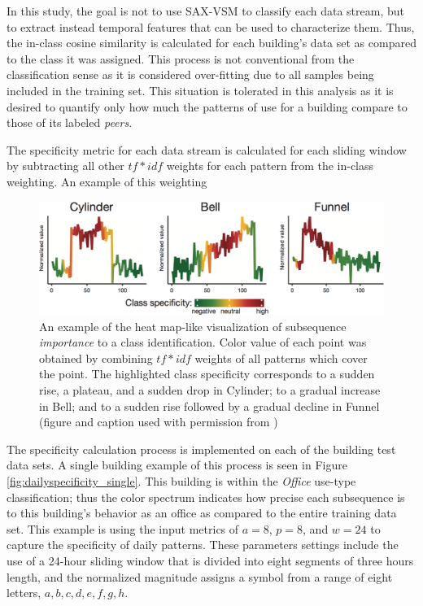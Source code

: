 In this study, the goal is not to use SAX-VSM to classify each data stream, but to extract instead temporal features that can be used to characterize them. Thus, the in-class cosine similarity is calculated for each building's data set as compared to the class it was assigned. This process is not conventional from the classification sense as it is considered over-fitting due to all samples being included in the training set. This situation is tolerated in this analysis as it is desired to quantify only how much the patterns of use for a building compare to those of its labeled \emph{peers}.

The specificity metric for each data stream is calculated for each sliding window by subtracting all other $tf*idf$ weights for each pattern from the in-class weighting. An example of this weighting

\begin{figure}[ht!]
\begin{center}
\includegraphics[width=1\columnwidth]{figures/jmotif_tfidfspec/jmotif_tfidfspec}
\caption{An example of the heat map-like visualization of subsequence \emph{importance} to a class identification. Color value of each point was obtained by combining $tf*idf$ weights of all patterns which cover the point. The highlighted class specificity corresponds to a sudden rise, a plateau, and a sudden drop in Cylinder; to a gradual increase in Bell; and to a sudden rise followed by a gradual decline in Funnel (figure and caption used with permission from \citep{senin_sax-vsm:_2013})
\label{fig:specificity_example}%
}
\end{center}
\end{figure}

The specificity calculation process is implemented on each of the building test data sets. A single building example of this process is seen in Figure \ref{fig:dailyspecificity_single}. This building is within the \emph{Office} use-type classification; thus the color spectrum indicates how precise each subsequence is to this building's behavior as an office as compared to the entire training data set. This example is using the input metrics of $a=8$, $p=8$, and $w=24$ to capture the specificity of daily patterns. These parameters settings include the use of a 24-hour sliding window that is divided into eight segments of three hours length, and the normalized magnitude assigns a symbol from a range of eight letters, $a,b,c,d,e,f,g,h$.

